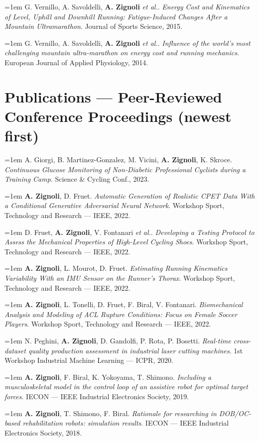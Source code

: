 \documentclass[10pt,a4paper]{article}
\newcommand{\pub}[3]{%
  \hangindent=1em\hangafter=1
  \small #1. \textit{#2}. #3.\par\vspace{3pt}%
}
\begin{document}
\pub{G. Vernillo, A. Savoldelli, \textbf{A. Zignoli} \textit{et al.}}{Energy Cost and Kinematics of Level, Uphill and Downhill Running: Fatigue-Induced Changes After a Mountain Ultramarathon}{Journal of Sports Science, 2015}

\pub{G. Vernillo, A. Savoldelli, \textbf{A. Zignoli} \textit{et al.}}{Influence of the world's most challenging mountain ultra-marathon on energy cost and running mechanics}{European Journal of Applied Physiology, 2014}

\section{Publications — Peer-Reviewed Conference Proceedings (newest first)}

\pub{A. Giorgi, B. Martinez-Gonzalez, M. Vicini, \textbf{A. Zignoli}, K. Skroce}{Continuous Glucose Monitoring of Non-Diabetic Professional Cyclists during a Training Camp}{Science \& Cycling Conf., 2023}

\pub{\textbf{A. Zignoli}, D. Fruet}{Automatic Generation of Realistic CPET Data With a Conditional Generative Adversarial Neural Network}{Workshop Sport, Technology and Research — IEEE, 2022}

\pub{D. Fruet, \textbf{A. Zignoli}, V. Fontanari \textit{et al.}}{Developing a Testing Protocol to Assess the Mechanical Properties of High-Level Cycling Shoes}{Workshop Sport, Technology and Research — IEEE, 2022}

\pub{\textbf{A. Zignoli}, L. Mourot, D. Fruet}{Estimating Running Kinematics Variability With an IMU Sensor on the Runner's Thorax}{Workshop Sport, Technology and Research — IEEE, 2022}

\pub{\textbf{A. Zignoli}, L. Tonelli, D. Fruet, F. Biral, V. Fontanari}{Biomechanical Analysis and Modeling of ACL Rupture Conditions: Focus on Female Soccer Players}{Workshop Sport, Technology and Research — IEEE, 2022}

\pub{N. Peghini, \textbf{A. Zignoli}, D. Gandolfi, P. Rota, P. Bosetti}{Real-time cross-dataset quality production assessment in industrial laser cutting machines}{1st Workshop Industrial Machine Learning — ICPR, 2020}

\pub{\textbf{A. Zignoli}, F. Biral, K. Yokoyama, T. Shimono}{Including a musculoskeletal model in the control loop of an assistive robot for optimal target forces}{IECON — IEEE Industrial Electronics Society, 2019}

\pub{\textbf{A. Zignoli}, T. Shimono, F. Biral}{Rationale for researching in DOB/OC-based rehabilitation robots: simulation results}{IECON — IEEE Industrial Electronics Society, 2018}
\end{document}
